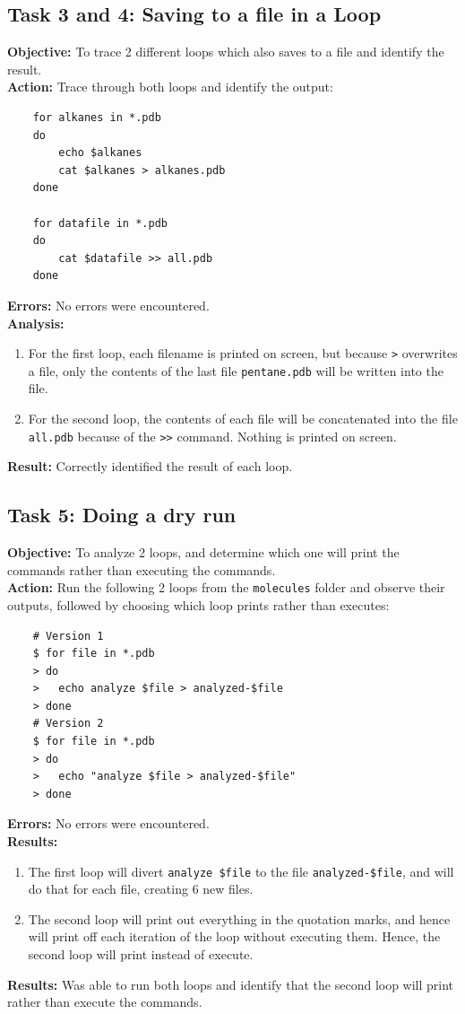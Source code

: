 \documentclass{article}
\begin{document}
\subsection{Task 3 and 4: Saving to a file in a Loop}
%
\textbf{Objective:} To trace 2 different loops which also saves to a file and identify the result.\\
\textbf{Action:} Trace through both loops and identify the output:
\begin{verbatim}
    for alkanes in *.pdb
    do
        echo $alkanes
        cat $alkanes > alkanes.pdb
    done
    
    for datafile in *.pdb
    do
        cat $datafile >> all.pdb
    done
\end{verbatim}
\textbf{Errors:} No errors were encountered.\\
\textbf{Analysis:}
\begin{enumerate}
    \item For the first loop, each filename is printed on screen, but because \texttt{>} overwrites a file, only the contents of the last file \texttt{pentane.pdb} will be written into the file.
    \item For the second loop, the contents of each file will be concatenated into the file \texttt{all.pdb} because of the \texttt{>>} command. Nothing is printed on screen.
\end{enumerate}
\textbf{Result:} Correctly identified the result of each loop.
%
\subsection{Task 5: Doing a dry run}
%
\textbf{Objective:} To analyze 2 loops, and determine which one will print the commands rather than executing the commands.\\
\textbf{Action:} Run the following 2 loops from the \texttt{molecules} folder and observe their outputs, followed by choosing which loop prints rather than executes:
\begin{verbatim}
    # Version 1
    $ for file in *.pdb
    > do
    >   echo analyze $file > analyzed-$file
    > done
    # Version 2
    $ for file in *.pdb
    > do
    >   echo "analyze $file > analyzed-$file"
    > done
\end{verbatim}
\textbf{Errors:} No errors were encountered.\\
\textbf{Results:} 
\begin{enumerate}
    \item The first loop will divert \verb|analyze $file| to the file \verb|analyzed-$file|, and will do that for each file, creating 6 new files.
    \item The second loop will print out everything in the quotation marks, and hence will print off each iteration of the loop without executing them. Hence, the second loop will print instead of execute.
\end{enumerate}
\textbf{Results:} Was able to run both loops and identify that the second loop will print rather than execute the commands.
%
\end{document}
